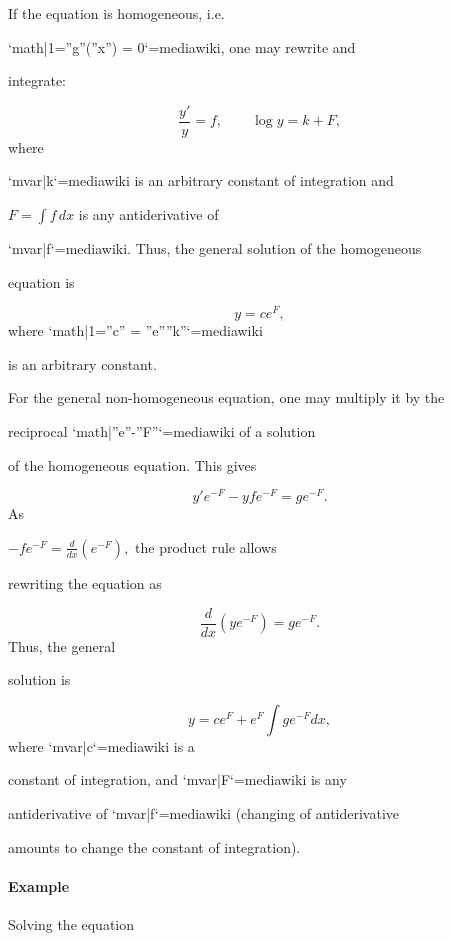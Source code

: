 If the equation is homogeneous, i.e.

`{{math|1=''g''(''x'') = 0}}`{=mediawiki}, one may rewrite and

integrate:



$$\frac{y'}{y}= f, \qquad \log y = k +F,$$ where

`{{mvar|k}}`{=mediawiki} is an arbitrary constant of integration and

$F=\textstyle\int f\,dx$ is any antiderivative of

`{{mvar|f}}`{=mediawiki}. Thus, the general solution of the homogeneous

equation is



$$y=ce^F,$$ where `{{math|1=''c'' = ''e''''k''}}`{=mediawiki}

is an arbitrary constant.



For the general non-homogeneous equation, one may multiply it by the

reciprocal `{{math|''e''-''F''}}`{=mediawiki} of a solution

of the homogeneous equation. This gives



$$y'e^{-F}-yfe^{-F}= ge^{-F}.$$ As

$-fe^{-F} = \frac{d}{dx} \left(e^{-F}\right),$ the product rule allows

rewriting the equation as



$$\frac{d}{dx}\left(ye^{-F}\right)= ge^{-F}.$$ Thus, the general

solution is



$$y=ce^F + e^F\int ge^{-F}dx,$$ where `{{mvar|c}}`{=mediawiki} is a

constant of integration, and `{{mvar|F}}`{=mediawiki} is any

antiderivative of `{{mvar|f}}`{=mediawiki} (changing of antiderivative

amounts to change the constant of integration).



\paragraph{Example}



Solving the equation



